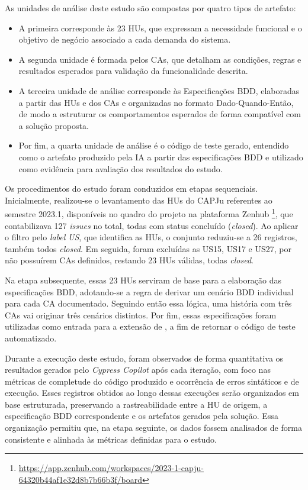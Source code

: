 As unidades de análise deste estudo são compostas por quatro tipos de artefato: 

\begin{itemize}
    \item A primeira corresponde às 23 HUs, que expressam a necessidade funcional e o objetivo de negócio associado a cada demanda do sistema.
    \item A segunda unidade é formada pelos CAs, que detalham as condições, regras e resultados esperados para validação da funcionalidade descrita.
    \item A terceira unidade de análise corresponde às Especificações BDD, elaboradas a partir das HUs e dos CAs e organizadas no formato Dado-Quando-Então, de modo a estruturar os comportamentos esperados de forma compatível com a solução proposta.
    \item Por fim, a quarta unidade de análise é o código de teste gerado, entendido como o artefato produzido pela IA a partir das especificações BDD e utilizado como evidência para avaliação dos resultados do estudo.
\end{itemize}

Os procedimentos do estudo foram conduzidos em etapas sequenciais. Inicialmente, realizou-se o levantamento das HUs do CAPJu referentes ao semestre 2023.1, disponíveis no quadro do projeto na plataforma Zenhub \footnote{\url{https://app.zenhub.com/workspaces/2023-1-capju-64320b44af1e32d8b7b66b3f/board}}, que contabilizava 127 \textit{issues} no total, todas com status concluído (\textit{closed}). Ao aplicar o filtro pelo \textit{label} \textit{US}, que identifica as HUs, o conjunto reduziu-se a 26 registros, também todos \textit{closed}. Em seguida, foram excluídas as US15, US17 e US27, por não possuírem CAs definidos, restando 23 HUs válidas, todas \textit{closed}.

Na etapa subsequente, essas 23 HUs serviram de base para a elaboração das especificações BDD, adotando-se a regra de derivar um cenário BDD individual para cada CA documentado. Seguindo então essa lógica, uma história com três CAs vai originar três cenários distintos. Por fim, essas especificações foram utilizadas como entrada para a extensão de , a fim de retornar o código de teste automatizado.


Durante a execução deste estudo, foram observados de forma quantitativa os resultados gerados pelo \textit{Cypress Copilot} após cada iteração, com foco nas métricas de completude do código produzido e ocorrência de erros sintáticos e de execução. Esses registros obtidos ao longo dessas execuções serão organizados em base estruturada, preservando a rastreabilidade entre a HU de origem, a especificação BDD correspondente e os artefatos gerados pela solução. Essa organização permitiu que, na etapa seguinte, os dados fossem analisados de forma consistente e alinhada às métricas definidas para o estudo.

